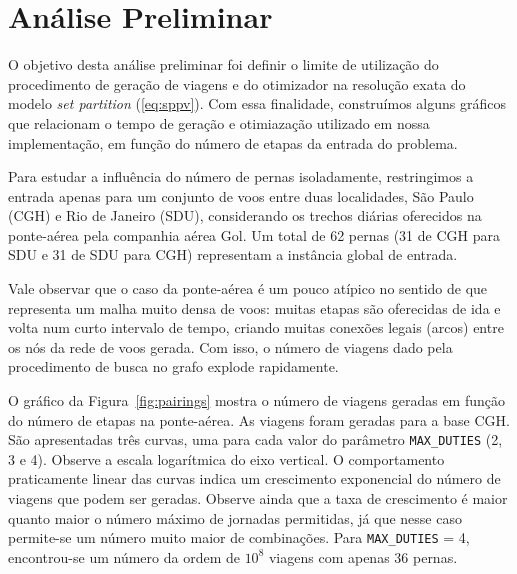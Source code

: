 
\section{Análise Preliminar}
\label{sec:preliminar}

O objetivo desta análise preliminar foi definir o limite de utilização do procedimento de geração
de viagens e do otimizador na resolução exata do modelo {\it set partition} (\ref{eq:sppv}).
Com essa finalidade, construímos alguns gráficos que relacionam o tempo de geração e otimiazação 
utilizado em nossa implementação, em função do número de etapas da entrada do problema.

Para estudar a influência do número de pernas isoladamente, restringimos a entrada apenas para um
conjunto de voos entre duas localidades, São Paulo (CGH) e Rio de Janeiro (SDU), considerando os
trechos diárias oferecidos na ponte-aérea pela companhia aérea Gol. Um total de 62 pernas 
(31 de CGH para SDU e 31 de SDU para CGH) representam a instância global de entrada.

Vale observar que o caso da ponte-aérea é um pouco atípico no sentido de que representa um malha 
muito densa de voos: muitas etapas são oferecidas de ida e volta num curto intervalo de tempo, 
criando muitas conexões legais (arcos) entre os nós da rede de voos gerada. Com isso, o número
de viagens dado pela procedimento de busca no grafo explode rapidamente.

O gráfico da Figura~\ref{fig:pairings} mostra o número de viagens geradas em função do número de
etapas na ponte-aérea. As viagens foram geradas para a base CGH. São apresentadas três curvas, uma
para cada valor do parâmetro \verb|MAX_DUTIES| (2, 3 e 4). Observe a escala logarítmica do eixo
vertical. O comportamento praticamente linear das curvas indica um crescimento exponencial do número
de viagens que podem ser geradas. Observe ainda que a taxa de crescimento é maior quanto maior o
número máximo de jornadas permitidas, já que nesse caso permite-se um número muito maior de
combinações. Para \verb|MAX_DUTIES| = 4, encontrou-se um número da ordem de $10^8$ viagens com
apenas 36 pernas.

